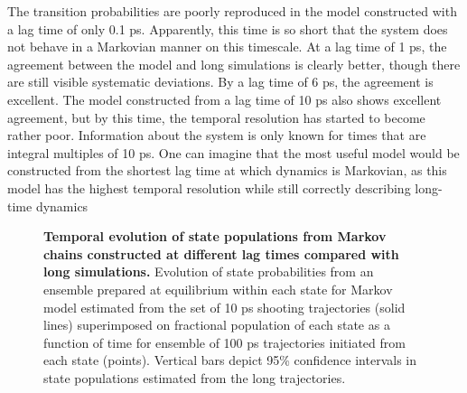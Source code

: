 The transition probabilities are poorly reproduced in the model constructed with a lag time of only 0.1 ps.
Apparently, this time is so short that the system does not behave in a Markovian manner on this timescale.
At a lag time of 1 ps, the agreement between the model and long simulations is clearly better, though there are still visible systematic deviations.
By a lag time of 6 ps, the agreement is excellent.
The model constructed from a lag time of 10 ps also shows excellent agreement, but by this time, the temporal resolution has started to become rather poor.
Information about the system is only known for times that are integral multiples of 10 ps.
One can imagine that the most useful model would be constructed from the shortest lag time at which dynamics is Markovian, as this model has the highest temporal resolution while still correctly describing long-time dynamics

\begin{figure}[tbp]
 \begin{center}
  \end{center}
  \caption{{\bf Temporal evolution of state populations from Markov chains constructed at different lag times compared with long simulations.}  Evolution of state probabilities from an ensemble prepared at equilibrium within each state for Markov model estimated from the set of 10 ps shooting trajectories (solid lines) superimposed on fractional population of each state as a function of time for ensemble of 100 ps trajectories initiated from each state (points).  
Vertical bars depict 95\% confidence intervals in state populations estimated from the long trajectories.}
  \label{long-times:figure:time-evolution-with-model}
\end{figure}

